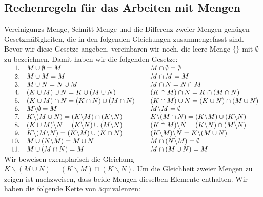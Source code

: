 \subsection{Rechenregeln f\"{u}r das Arbeiten mit Mengen}
 Vereinigungs-Menge,  Schnitt-Menge und die Differenz zweier Mengen gen\"{u}gen Gesetzm\"{a}ßigkeiten, 
die in den folgenden Gleichungen zusammengefasst sind.  Bevor wir diese Gesetze angeben, vereinbaren wir noch,
die leere Menge $\{\}$ mit $\emptyset$ zu bezeichnen. 
Damit haben wir die folgenden Gesetze:
\\[0.2cm]
$\begin{array}{rlcl}
\quad 1. & M \cup \emptyset = M         & \hspace*{0.1cm} & M \cap \emptyset = \emptyset \\
2. & M \cup M = M         & \hspace*{0.1cm} & M \cap M = M          \\
3. & M \cup N = N \cup M  &  & M \cap N = N \cap M  \\
4. & (K \cup M) \cup N = K \cup (M \cup N) &  & (K \cap M) \cap N = K \cap (M \cap N) \\
5. & (K \cup M) \cap N = (K \cap N) \cup (M \cap N) &  & (K \cap M) \cup N = (K \cup N) \cap (M \cup N)  \\
6. & M \backslash \emptyset = M & & M \backslash M = \emptyset \\
7. & K \backslash (M \cup N) = (K \backslash M) \cap (K \backslash N) &&
     K \backslash (M \cap N) = (K \backslash M) \cup (K \backslash N) \\
8. & (K \cup M) \backslash N = (K \backslash N) \cup (M \backslash N) &&
     (K \cap M) \backslash N = (K \backslash N) \cap (M \backslash N) \\
9. & K \backslash (M \backslash N) = (K \backslash M) \cup (K \cap N) &&
     (K \backslash M) \backslash N = K \backslash (M \cup N) \\
10. & M \cup (N \backslash M) = M \cup N &&
      M \cap (N \backslash M) = \emptyset  \\
11. & M \cup (M \cap N) = M  &&
      M \cap (M \cup N) = M 

\end{array}$
\\[0.3cm]
Wir beweisen exemplarisch die Gleichung $K \backslash (M \cup N) = (K \backslash M) \cap (K \backslash N)$.
Um die Gleichheit zweier Mengen zu zeigen ist nachzweisen, dass beide Mengen dieselben Elemente enthalten.
Wir haben die folgende Kette von \"{a}quivalenzen: \\[0.3cm]
